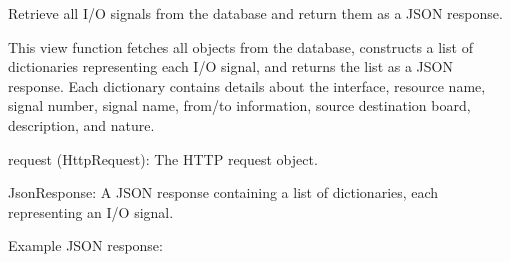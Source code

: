 \documentclass[letterpaper,10pt,english]{sphinxmanual}
\begin{document}

\begin{fulllineitems}
\label{\detokenize{app:app.views.get_iosignals}}
\pysigstartsignatures
{}
\pysigstopsignatures
\sphinxAtStartPar
Retrieve all I/O signals from the database and return them as a JSON response.

\sphinxAtStartPar
This view function fetches all  objects from the database, constructs 
a list of dictionaries representing each I/O signal, and returns the list as a JSON response. 
Each dictionary contains details about the interface, resource name, signal number, signal name, 
from/to information, source destination board, description, and nature.
\begin{description}
\sphinxAtStartPar
request (HttpRequest): The HTTP request object.

\sphinxAtStartPar
JsonResponse: A JSON response containing a list of dictionaries, each representing an I/O signal.

\sphinxAtStartPar
Example JSON response:


\end{description}
\end{fulllineitems}
\end{document}
